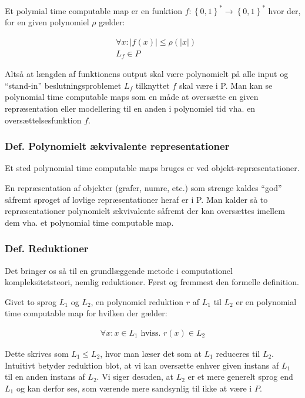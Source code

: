 Et polymial time computable map er en funktion $f: \left\lbrace 0,1 \right\rbrace^* \rightarrow \left\lbrace 0,1 \right\rbrace^*$ hvor der, for en given polynomiel $\rho$ gælder:

\begin{align*}
 &\forall x: |f(x)| \leq \rho(|x|) \\
 &L_f	 \in P
\end{align*}

Altså at længden af funktionens output skal være polynomielt på alle input og ``stand-in'' beslutningsproblemet $L_f$ tilknyttet $f$ skal være i P. Man kan se polynomial time computable maps som en måde at oversætte en given repræsentation eller modellering til en anden i polynomiel tid vha. en oversættelsesfunktion $f$.

\subsubsection{Def. Polynomielt ækvivalente representationer}

Et sted polynomial time computable maps bruges er ved objekt-repræsentationer.

En repræsentation af objekter (grafer, numre, etc.) som strenge kaldes ``god'' såfremt sproget af lovlige repræsentationer heraf er i P. Man kalder så to repræsentationer polynomielt ækvivalente såfremt der kan oversættes imellem dem vha. et polynomial time computable map.


\subsubsection{Def. Reduktioner}

Det bringer os så til en grundlæggende metode i computationel kompleksitetsteori, nemlig reduktioner. Først og fremmest den formelle definition.

Givet to sprog $L_1$ og $L_2$, en polynomiel reduktion $r$ af $L_1$ til $L_2$ er en polynomial time computable map for hvilken der gælder:

\begin{align*}
 \forall x : x \in L_1 \text{ hviss. } r(x) \in L_2
\end{align*}

Dette skrives som $L_1 \leq L_2$, hvor man læser det som at $L_1$ reduceres til $L_2$. Intuitivt betyder reduktion blot, at vi kan oversætte enhver given instans af $L_1$ til en anden instans af $L_2$. Vi siger desuden, at $L_2$ er et mere generelt sprog end $L_1$ og kan derfor ses, som værende mere sandsynlig til ikke at være i $P$.


